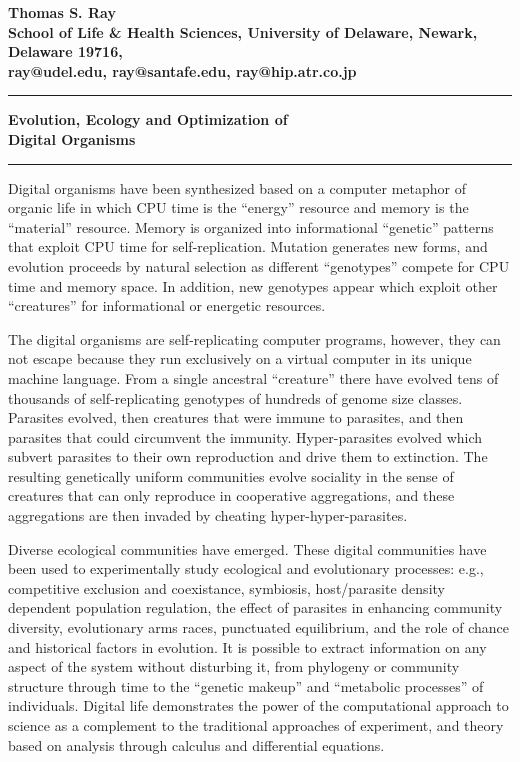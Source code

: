 \def\XP{\par\begingroup\parindent 0in\everypar{\hangindent .3in}}
\def\eXP{\par\endgroup}

\def\LP{\par\begingroup\parindent 0in\everypar{\hangindent 0in}}
\def\eLP{\par\endgroup}


\thispagestyle{empty}

\LP
\bf Thomas S. Ray\rm \\
School of Life \& Health Sciences, University of Delaware, Newark, Delaware
19716,\\
ray@udel.edu, ray@santafe.edu, ray@hip.atr.co.jp\\
\rule[6pt]{6.5in}{1pt}
\Large \bf Evolution, Ecology and Optimization of\\
Digital Organisms\rm \normalsize\\
\rule[6pt]{6.5in}{2pt}
\eLP

Digital organisms have been synthesized based on a computer metaphor of
organic life in which CPU time is the ``energy'' resource and memory is
the ``material'' resource.  Memory is organized into informational ``genetic''
patterns that exploit CPU time for self-replication.  Mutation generates
new forms, and evolution proceeds by natural selection as different
``genotypes'' compete for CPU time and memory space.  In addition, new
genotypes appear which exploit other ``creatures'' for informational or
energetic resources.

The digital organisms are self-replicating computer programs, however,
they can not escape because they run exclusively on a virtual computer
in its unique machine language.  From a single ancestral ``creature''
there have evolved tens of thousands of self-replicating genotypes of
hundreds of genome size classes.  Parasites evolved, then creatures that
were immune to parasites, and then parasites that could circumvent the
immunity.  Hyper-parasites evolved which subvert parasites to their own
reproduction and drive them to extinction.  The resulting genetically
uniform communities evolve sociality in the sense of creatures that can
only reproduce in cooperative aggregations, and these aggregations are
then invaded by cheating hyper-hyper-parasites.

Diverse ecological communities have emerged.  These digital communities
have been used to experimentally study ecological and evolutionary processes:
e.g., competitive exclusion and coexistance, symbiosis, host/parasite density
dependent population regulation, the effect of parasites in enhancing
community diversity, evolutionary arms races, punctuated equilibrium, and
the role of chance and historical factors in evolution.  It is possible to
extract information on any aspect of the system without disturbing it, from
phylogeny or community structure through time to the ``genetic makeup'' and
``metabolic processes'' of individuals.  Digital life demonstrates the
power of the computational approach to science as a complement to the
traditional approaches of experiment, and theory based on analysis through
calculus and differential equations.

